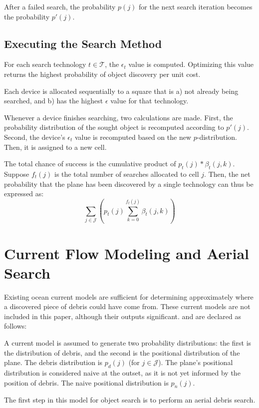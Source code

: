 \documentclass[a4paper]{article}
\begin{document}
After a failed search, the probability $p(j)$ for the next search iteration becomes the probability $p'(j)$.

\subsection{Executing the Search Method}

For each search technology $t\in\mathcal{T}$, the $\epsilon_t$ value is computed. Optimizing this value returns the highest probability of object discovery per unit cost.

Each device is allocated sequentially to a square that is a) not already being searched, and b) has the highest $\epsilon$ value for that technology. 

Whenever a device finishes searching, two calculations are made. First, the probability distribution of the sought object is recomputed according to $p'(j)$. Second, the device's $\epsilon_t$ value is recomputed based on the new $p$-distribution. Then, it is assigned to a new cell.

The total chance of success is the cumulative product of $p_t(j)*\beta_t(j,k)$. Suppose $f_t(j)$ is the total number of searches allocated to cell $j$. Then, the net probability that the plane has been discovered by a single technology can thus be expressed as: $$\sum_{j\in\mathcal{J}}\left(p_t(j)\sum_{k=0}^{f_t(j)}\beta_t(j,k)\right)$$



\section{Current Flow Modeling and Aerial Search}

Existing ocean current models are sufficient for determining approximately where a discovered piece of debris could have come from. These current models are not included in this paper, although their outputs significant. and are declared as follows:

A current model is assumed to generate two probability distributions: the first is the distribution of debris, and the second is the positional distribution of the plane. The debris distribution is $p_d(j)$ (for $j\in\mathcal{J}$). The plane's positional distribution is considered naive at the outset, as it is not yet informed by the position of debris. The naive positional distribution is $p_n(j)$. 

The first step in this model for object search is to perform an aerial debris search. 
\end{document}
